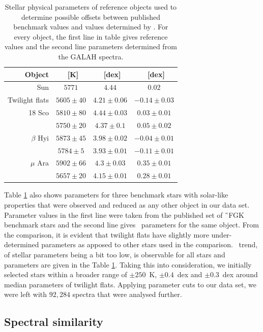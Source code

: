 \begin{table}
	\centering
	\caption{Stellar physical parameters of reference objects used to determine possible offsets between published benchmark values and values determined by \TC. For every object, the first line in table gives reference values and the second line parameters determined from the GALAH spectra.}
	\label{tab:params_twins}
	\begin{tabular}{r c c c}
		\hline
		Object & \Teff\ [K] & \Logg\ [dex] & \Feh\ [dex] \\ 
		\hline
		Sun & $5771$ & $4.44$ & $0.02$ \\ 
		Twilight flats & $5605 \pm 40$ & $4.21 \pm 0.06$ & $-0.14 \pm 0.03$ \\ 
		\hline
		18 Sco & $5810 \pm 80$ & $4.44 \pm 0.03$ & $0.03 \pm 0.01$ \\
		& $5750 \pm 20 $ & $4.37 \pm 0.1$ & $ 0.05 \pm 0.02$ \\ 
		\hline
		$\beta$ Hyi & $5873 \pm 45$ & $3.98 \pm 0.02$ & $-0.04 \pm 0.01$ \\
		& $5784 \pm 5$ & $3.93 \pm 0.01$ & $-0.11 \pm 0.01$ \\ 
		\hline
		$\mu$ Ara & $5902 \pm 66$ & $4.3 \pm 0.03$ & $0.35 \pm 0.01$ \\
		& $5657 \pm 20$ & $4.15 \pm 0.01$ & $0.28 \pm 0.01$ \\
		\hline
	\end{tabular}
\end{table}

Table \ref{tab:params_twins} also shows parameters for three benchmark stars with solar-like properties that were observed and reduced as any other object in our data set. Parameter values in the first line were taken from the published set of \G\ FGK benchmark stars \cite{2014A&A...564A.133J, 2015A&A...582A..49H} and the second line gives \TC\ parameters for the same object. From the comparison, it is evident that twilight flats have slightly more under-determined parameters as apposed to other stars used in the comparison. \TC\ trend, of stellar parameters being a bit too low, is observable for all stars and parameters are given in the Table \ref{tab:params_twins}. Taking this into consideration, we initially selected stars within a broader range of \Teff$ \pm 250 $~K, \Logg$ \pm 0.4 $~dex and \Feh$ \pm 0.3 $~dex around median parameters of twilight flats. Applying parameter cuts to our data set, we were left with $92,284$ spectra that were analysed further.

\subsection{Spectral similarity}
\label{sec:spec_comp_twins}

